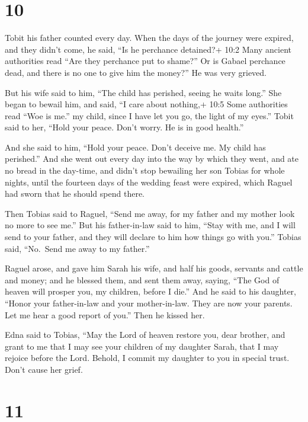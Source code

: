 \hypertarget{section-9}{%
\section{10}\label{section-9}}

 Tobit his father counted every day. When the days of the
journey were expired, and they didn't come,  he said, ``Is
he perchance detained?+ 10:2 Many ancient authorities read ``Are they
perchance put to shame?'' Or is Gabael perchance dead, and there is no
one to give him the money?''  He was very grieved.

 But his wife said to him, ``The child has perished, seeing
he waits long.'' She began to bewail him, and said,  ``I
care about nothing,+ 10:5 Some authorities read ``Woe is me.'' my child,
since I have let you go, the light of my eyes.''  Tobit said
to her, ``Hold your peace. Don't worry. He is in good health.''

 And she said to him, ``Hold your peace. Don't deceive me.
My child has perished.'' And she went out every day into the way by
which they went, and ate no bread in the day-time, and didn't stop
bewailing her son Tobias for whole nights, until the fourteen days of
the wedding feast were expired, which Raguel had sworn that he should
spend there.

Then Tobias said to Raguel, ``Send me away, for my father and my mother
look no more to see me.''  But his father-in-law said to
him, ``Stay with me, and I will send to your father, and they will
declare to him how things go with you.''  Tobias said,
``No.~Send me away to my father.''

 Raguel arose, and gave him Sarah his wife, and half his
goods, servants and cattle and money;  and he blessed them,
and sent them away, saying, ``The God of heaven will prosper you, my
children, before I die.''  And he said to his daughter,
``Honor your father-in-law and your mother-in-law. They are now your
parents. Let me hear a good report of you.'' Then he kissed her.

Edna said to Tobias, ``May the Lord of heaven restore you, dear brother,
and grant to me that I may see your children of my daughter Sarah, that
I may rejoice before the Lord. Behold, I commit my daughter to you in
special trust. Don't cause her grief.

\hypertarget{section-10}{%
\section{11}\label{section-10}}

